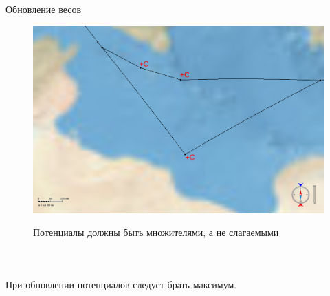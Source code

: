 \documentclass[russian, hyperref={unicode}]{beamer}
\begin{document}
\begin{frame}[noframenumbering]{Обновление весов}
     {
        \begin{figure}
            \includegraphics[width=\textwidth, clip=true, trim = 120
            200 0 0]{Solution/potentials-multipliers}

            Потенциалы должны быть множителями, а не слагаемыми
        \end{figure}
    }
 
     {
        \begin{columns}
            \begin{figure}
            \end{figure}

            \begin{figure}
            \end{figure}
        \end{columns}

        \begin{center}
            При обновлении потенциалов следует брать максимум.
        \end{center}
    }
   
     {
        \begin{columns}
            \begin{figure}
            \end{figure}

            \begin{figure}
            \end{figure}
        \end{columns}

}
\end{frame}
\end{document}

